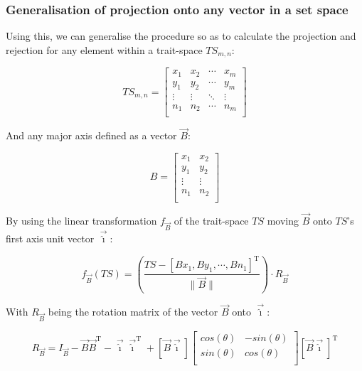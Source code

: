 \documentclass[12pt,a4paper]{article}
\begin{document}
\subsubsection{Generalisation of projection onto any vector in a set space}

Using this, we can generalise the procedure so as to calculate the projection and rejection for any element within a trait-space $TS_{m,n}$:

\begin{equation}
    TS_{m,n} = 
    \begin{bmatrix}
    x_{1} & x_{2} & \cdots & x_{m} \\
    y_{1} & y_{2} & \cdots & y_{m} \\
    \vdots  & \vdots  & \ddots & \vdots \\
    n_{1} & n_{2} & \cdots & n_{m} \\
    \end{bmatrix}
\end{equation}

And any major axis defined as a vector $\vec{B}$:

\begin{equation}
    B = 
    \begin{bmatrix}
    x_{1} & x_{2}\\
    y_{1} & y_{2}\\
    \vdots  & \vdots  \\
    n_{1} & n_{2} \\
    \end{bmatrix}
\end{equation}


By using the linear transformation $f_{\vec{B}}$ of the trait-space $TS$ moving $\vec{B}$ onto $TS$'s first axis unit vector $\vec{\hat{\imath}}$:

$$f_{\vec{B}}(TS) = \left( \frac{TS - [Bx_{1}, By_{1}, \cdots, Bn_{1}]^{\text{T}}}{\|\vec{B}\|} \right) \cdot R_{\vec{B}}$$

With $R_{\vec{B}}$ being the rotation matrix of the vector $\vec{B}$ onto $\vec{\hat{\imath}}$:

\begin{equation}
R_{\vec{B}} = I_{\vec{B}} - \vec{B}\vec{B}^\text{T} - \vec{\hat{\imath}}\vec{\hat{\imath}}^\text{T} + [\vec{B} \vec{\hat{\imath}}]
    \begin{bmatrix}
        cos(\theta) & -sin(\theta)\\
        sin(\theta) & cos(\theta)\\
    \end{bmatrix} [\vec{B} \vec{\hat{\imath}}]^\text{T}
\end{equation}
\end{document}
